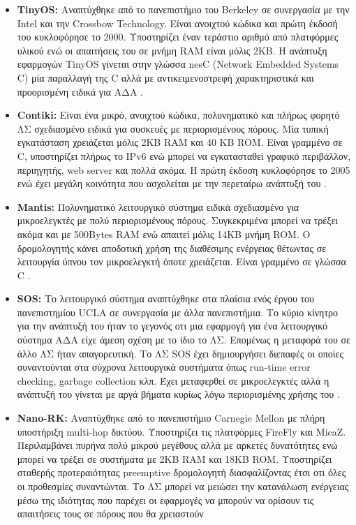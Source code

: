 \begin{itemize}
\item \textbf{TinyOS:} Αναπτύχθηκε από το πανεπιστήμιο του Berkeley σε συνεργασία με την Intel και την Crossbow Technology.
Είναι ανοιχτού κώδικα και πρώτη έκδοσή του κυκλοφόρησε το 2000.
Υποστηρίζει έναν τεράστιο αριθμό από πλατφόρμες υλικού ενώ οι απαιτήσεις του σε μνήμη RAM είναι μόλις 2KB.
Η ανάπτυξη εφαρμογών TinyOS γίνεται στην γλώσσα nesC (Network Embedded Systems C) μία παραλλαγή της C αλλά με αντικειμενοστρεφή χαρακτηριστικά και προορισμένη ειδικά
για ΑΔΑ \cite{tinyos}.
\item \textbf{Contiki:} Είναι ένα μικρό, ανοιχτού κώδικα, πολυνηματικό και πλήρως φορητό ΛΣ σχεδιασμένο ειδικά για συσκευές με περιορισμένους πόρους.
Μία τυπική εγκατάσταση χρειάζεται μόλις 2KB RAM και 40 KB ROM.
Είναι γραμμένο σε C, υποστηρίζει πλήρως το IPv6 ενώ μπορεί να εγκατασταθεί γραφικό περιβάλλον, περιηγητής, web server και πολλά ακόμα.
Η πρώτη έκδοση κυκλοφόρησε το 2005 ενώ έχει μεγάλη κοινότητα που ασχολείται με την περεταίρω ανάπτυξή του \cite{contiki}.
\item \textbf{Mantis:} Πολυνηματικό λειτουργικό σύστημα ειδικά σχεδιασμένο για μικροελεγκτές με πολύ περιορισμένους πόρους.
Συγκεκριμένα μπορεί να τρέξει ακόμα και με 500Bytes RAM ενώ απαιτεί μόλις 14KB μνήμη ROM.
Ο δρομολογητής κάνει αποδοτική χρήση της διαθέσιμης ενέργειας θέτωντας σε λειτουργία ύπνου τον μικροελεγκτή όποτε χρειάζεται.
Είναι γραμμένο σε γλώσσα C \cite{mantis}.
\item \textbf{SOS:} Το λειτουργικό σύστημα αναπτύχθηκε στα πλαίσια ενός έργου του πανεπιστημίου UCLA σε συνεργασία με άλλα πανεπιστήμια.
Το κύριο κίνητρο για την ανάπτυξή του ήταν το γεγονός οτι μια εφαρμογή για ένα λειτουργικό σύστημα ΑΔΑ είχε άμεση σχέση με το ίδιο το ΛΣ.
Επομένως η μεταφορά του σε άλλο ΛΣ ήταν απαγορευτική.
Το ΛΣ SOS έχει δημιουργήσει διεπαφές οι οποίες συναντούνται στα σύχρονα λειτουργικά συστήματα όπως run-time error checking, garbage collection κλπ.
Έχει μεταφερθεί σε μικροελεγκτές αλλά η ανάπτυξή του γίνεται με αργά βήματα κυρίως λόγω περιορισμένης χρήσης του \cite{sos_os}.
\item \textbf{Nano-RK:} Αναπτύχθηκε από το πανεπιστήμιο Carnegie Mellon με πλήρη υποστήριξη multi-hop δικτύου.
Υποστηρίζει τις πλατφόρμες FireFly και MicaZ.
Περιλαμβάνει πυρήνα πολύ μικρού μεγέθους αλλά με αρκετές δυνατότητες ενώ μπορεί να τρέξει σε συστήματα με 2KB RAM και 18KB ROM.
Υποστηρίζει σταθερής προτεραιότητας preemptive δρομολογητή διασφαλίζοντας έτσι οτι όλες οι προθεσμίες συναντώνται.
Το ΛΣ μπορεί να μειώσει την κατανάλωση ενέργειας μέσω της ιδιότητας που παρέχει οι εφαρμογές να μπορούν να ορίσουν τις απαιτήσεις τους σε πόρους που θα χρειαστούν

\end{itemize}
